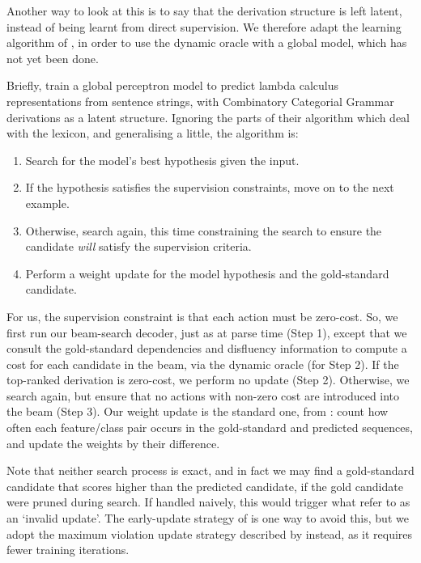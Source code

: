 \documentclass[11pt,letterpaper]{article}
\begin{document}
Another way to look at this is to say that the derivation structure is left latent,
instead of being learnt from direct supervision.  
We therefore adapt the learning
algorithm of \citet{zettlemoyer:07}, in order to use the dynamic oracle with
a global model, which has not yet been done.

Briefly, \citeauthor{zettlemoyer:07} train a global perceptron model to predict
lambda calculus representations from sentence strings, with Combinatory
Categorial Grammar derivations as a latent structure.  Ignoring the parts of
their algorithm which deal with the lexicon, and generalising a little, the algorithm is:

\begin{enumerate}
\item Search for the model's best hypothesis given the input.
\item If the hypothesis satisfies the supervision constraints, move on to the
      next example.
\item Otherwise, search again, this time constraining the search to ensure the
    candidate \emph{will} satisfy the supervision criteria.
\item Perform a weight update for the model hypothesis and the gold-standard
      candidate.
\end{enumerate}

For us, the supervision constraint is that each action must be zero-cost.  So,
we first run our beam-search decoder, just as at parse time (Step 1),
except that we consult the gold-standard dependencies and disfluency information
to compute a cost for each candidate in the beam, via the dynamic oracle (for Step 2).
If the top-ranked derivation is zero-cost, we perform no update (Step 2).
Otherwise, we search again, but
ensure that no actions with non-zero cost are introduced into the beam (Step 3).
Our weight update is the standard one, from \citet{collins:02}: count how often
each feature/class pair occurs in the gold-standard and predicted sequences,
and update the weights by their difference.

Note that neither search process is exact, and in fact we may find a gold-standard
candidate that scores higher than the predicted candidate, if the gold candidate
were pruned during search.  If handled naively, this would trigger what \citet{huang:12}
refer to as an `invalid update'.  The early-update strategy of \citet{collins:02}
is one way to avoid this, but we adopt the maximum violation update strategy
described by \citet{huang:12} instead, as it requires fewer training iterations.
\end{document}
